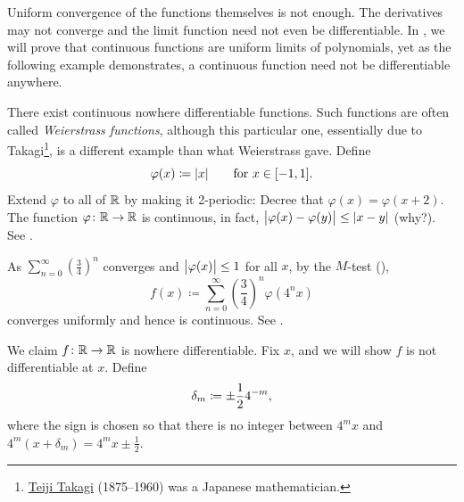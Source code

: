 Uniform convergence of the functions themselves is not enough.
The derivatives may not converge and the limit function need not even be
differentiable.
In , we will prove that
continuous functions are uniform limits of polynomials, yet as the following
example demonstrates, a continuous function need not be differentiable
anywhere.

\begin{example}
There exist continuous nowhere differentiable functions.
Such functions are often called
\emph{Weierstrass functions},
although this
particular one, essentially due to
Takagi\footnote{\href{https://en.wikipedia.org/wiki/Teiji_Takagi}{Teiji
Takagi} (1875--1960) was a Japanese mathematician.}, is a different example than what Weierstrass gave.
Define
\begin{equation*}
\varphi(x) \coloneqq \lvert {x} \rvert \qquad \text{for } x \in [-1,1] .
\end{equation*}
Extend $\varphi$ to all of ${\mathbb{R}}$ by making it
2-periodic:
Decree that
$\varphi(x) = \varphi(x+2)$.  The function $\varphi \colon {\mathbb{R}} \to {\mathbb{R}}$
is continuous, in fact, $\bigl\lvert {\varphi(x)-\varphi(y)} \bigr\rvert \leq \lvert {x-y} \rvert$ (why?).
See .
\begin{myfigureht}
\caption{The 2-periodic function $\varphi$.\label{fig:triangwave}}
\end{myfigureht}

As $\sum_{n=0}^\infty {\left(\frac{3}{4}\right)}^n$ converges and $\bigl\lvert {\varphi(x)} \bigr\rvert \leq
1$ for all $x$, by the $M$-test
(),
\begin{equation*}
f(x) \coloneqq \sum_{n=0}^\infty 
{\left(\frac{3}{4}\right)}^n \varphi(4^n x)
\end{equation*}
converges uniformly and hence is continuous.
See .

\begin{myfigureht}
\caption{Plot of the nowhere differentiable function $f$.\label{fig:nowherediff}}
\end{myfigureht}

We claim $f \colon
{\mathbb{R}} \to {\mathbb{R}}$ is nowhere differentiable.
Fix $x$, and we will show $f$ is not differentiable at $x$.
Define
\begin{equation*}
\delta_m \coloneqq \pm \frac{1}{2} 4^{-m} ,
\avoidbreak
\end{equation*}
where the sign is chosen so that there is no integer
between $4^m x$ and $4^m(x+\delta_m) = 4^m x \pm \frac{1}{2}$.


\end{example}
